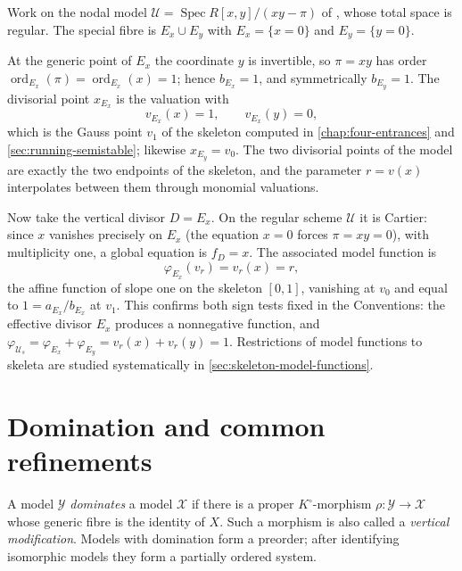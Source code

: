 \begin{example}
\label{ex:node-divisorial-model-function}
Work on the nodal model
$\mathcal U=\operatorname{Spec}R[x,y]/(xy-\pi)$ of ,
whose total space is regular.  The special fibre is
$E_x\cup E_y$ with $E_x=\{x=0\}$ and $E_y=\{y=0\}$.

At the generic point of $E_x$ the coordinate $y$ is invertible, so
$\pi=xy$ has order $\operatorname{ord}_{E_x}(\pi)=\operatorname{ord}_{E_x}(x)=1$;
hence $b_{E_x}=1$, and symmetrically $b_{E_y}=1$.  The divisorial point
$x_{E_x}$ is the valuation with
\[
                 v_{E_x}(x)=1,\qquad v_{E_x}(y)=0,
\]
which is the Gauss point $v_1$ of the skeleton computed in
\cref{chap:four-entrances} and \cref{sec:running-semistable}; likewise
$x_{E_y}=v_0$.  The two divisorial points of the model are exactly the two
endpoints of the skeleton, and the parameter $r=v(x)$ interpolates between
them through monomial valuations.

Now take the vertical divisor $D=E_x$.  On the regular scheme $\mathcal U$
it is Cartier: since $x$ vanishes precisely on $E_x$
(the equation $x=0$ forces $\pi=xy=0$), with multiplicity one, a global
equation is $f_D=x$.  The associated model function is
\[
     \varphi_{E_x}(v_r)=v_r(x)=r,
\]
the affine function of slope one on the skeleton $[0,1]$, vanishing at
$v_0$ and equal to $1=a_{E_x}/b_{E_x}$ at $v_1$.  This confirms both sign
tests fixed in the Conventions: the effective divisor $E_x$ produces a
nonnegative function, and
$\varphi_{\mathcal U_s}=\varphi_{E_x}+\varphi_{E_y}=v_r(x)+v_r(y)=1$.
Restrictions of model functions to skeleta are studied systematically in
\cref{sec:skeleton-model-functions}.
\end{example}

\section{Domination and common refinements}

\begin{definition}\label{def:model-domination}
A model $\mathcal Y$ \emph{dominates} a model $\mathcal X$ if there is a
proper $K^\circ$-morphism
$\rho:\mathcal Y\to\mathcal X$ whose generic fibre is the identity of $X$.
Such a morphism is also called a \emph{vertical modification}. Models with
domination form a preorder; after identifying isomorphic models they form a
partially ordered system.
\end{definition}


